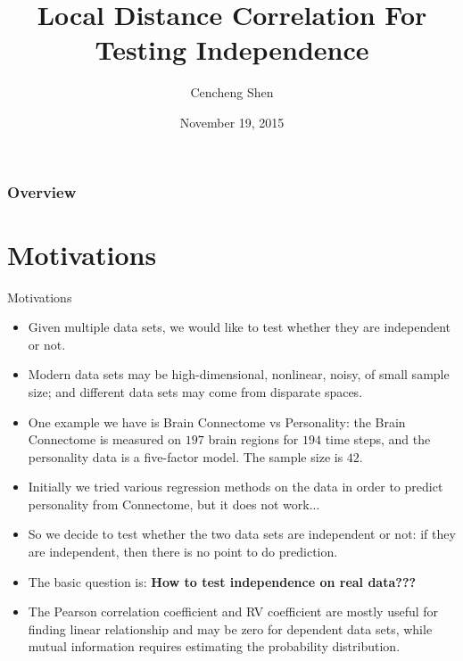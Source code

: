 \documentclass{beamer}
\title[]{Local Distance Correlation For Testing Independence}
\author{Cencheng Shen} %
\institute[Temple University] %
{
\textit{Joint Work with Joshua T. Vogelstein \& Carey E. Priebe} \\
}
\date{November 19, 2015} %
\begin{document}
\begin{frame}
\titlepage %
\end{frame}

\begin{frame}
\frametitle{Overview} %
\tableofcontents %
\end{frame}

\section{Motivations}
\begin{frame}{Motivations}
\begin{itemize}[<+->]
\item Given multiple data sets, we would like to test whether they are independent or not.
\item Modern data sets may be high-dimensional, nonlinear, noisy, of small sample size; and different data sets may come from disparate spaces.
\item One example we have is Brain Connectome vs Personality: the Brain Connectome is measured on $197$ brain regions for $194$ time steps, and the personality data is a five-factor model. The sample size is $42$.
\item Initially we tried various regression methods on the data in order to predict personality from Connectome, but it does not work...  
\end{itemize}
\end{frame}

\begin{frame}
\begin{itemize}[<+->]
\item So we decide to test whether the two data sets are independent or not: if they are independent, then there is no point to do prediction.
\item The basic question is: \textbf{How to test independence on real data???}
\item The Pearson correlation coefficient and RV coefficient are mostly useful for finding linear relationship and may be zero for dependent data sets, while mutual information requires estimating the probability distribution.
\end{itemize}
\end{frame}
\end{document}
